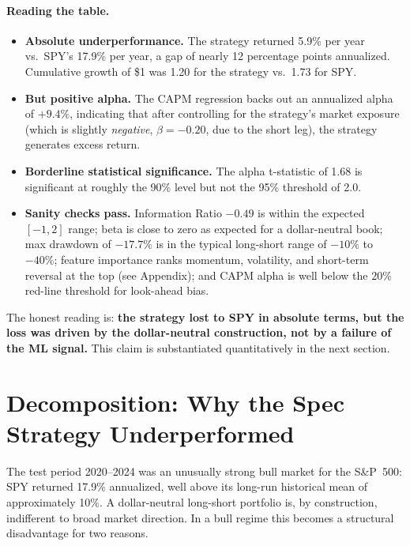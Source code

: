 \documentclass[11pt]{article}
\begin{document}
\paragraph{Reading the table.}
\begin{itemize}[leftmargin=*, itemsep=2pt]
    \item \textbf{Absolute underperformance.} The strategy returned 5.9\% per year vs.\
    SPY's 17.9\% per year, a gap of nearly 12 percentage points annualized. Cumulative
    growth of \$1 was 1.20 for the strategy vs.\ 1.73 for SPY.
    \item \textbf{But positive alpha.} The CAPM regression backs out an annualized alpha
    of $+9.4\%$, indicating that after controlling for the strategy's market exposure
    (which is slightly \emph{negative}, $\beta=-0.20$, due to the short leg), the strategy
    generates excess return.
    \item \textbf{Borderline statistical significance.} The alpha t-statistic of 1.68 is
    significant at roughly the 90\% level but not the 95\% threshold of 2.0.
    \item \textbf{Sanity checks pass.} Information Ratio $-0.49$ is within the expected
    $[-1,2]$ range; beta is close to zero as expected for a dollar-neutral book; max
    drawdown of $-17.7\%$ is in the typical long-short range of $-10\%$ to $-40\%$;
    feature importance ranks momentum, volatility, and short-term reversal at the top
    (see Appendix); and CAPM alpha is well below the $20\%$ red-line threshold for
    look-ahead bias.
\end{itemize}

The honest reading is: \textbf{the strategy lost to SPY in absolute terms, but the loss
was driven by the dollar-neutral construction, not by a failure of the ML signal.}
This claim is substantiated quantitatively in the next section.

\section{Decomposition: Why the Spec Strategy Underperformed}
\label{sec:decomp}
The test period 2020--2024 was an unusually strong bull market for the S\&P~500: SPY
returned 17.9\% annualized, well above its long-run historical mean of approximately
10\%. A dollar-neutral long-short portfolio is, by construction, indifferent to broad
market direction. In a bull regime this becomes a structural disadvantage for two reasons.
\end{document}
